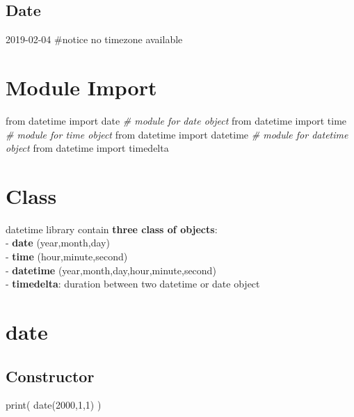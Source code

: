\documentclass[
]{book}
\newenvironment{Shaded}{\begin{snugshade}}{\end{snugshade}}
\newcommand{\BuiltInTok}[1]{#1}
\newcommand{\CommentTok}[1]{\textcolor[rgb]{0.37,0.37,0.37}{\textit{#1}}}
\newcommand{\DecValTok}[1]{\textcolor[rgb]{0.06,0.06,0.06}{#1}}
\newcommand{\ImportTok}[1]{#1}
\newcommand{\NormalTok}[1]{#1}
\begin{document}
\hypertarget{date}{%
\subsection{Date}\label{date}}

2019-02-04 \#notice no timezone available

\hypertarget{module-import}{%
\section{Module Import}\label{module-import}}

\begin{Shaded}
\begin{Highlighting}[]
\ImportTok{from}\NormalTok{ datetime }\ImportTok{import}\NormalTok{ date     }\CommentTok{\# module for date object}
\ImportTok{from}\NormalTok{ datetime }\ImportTok{import}\NormalTok{ time     }\CommentTok{\# module for time object}
\ImportTok{from}\NormalTok{ datetime }\ImportTok{import}\NormalTok{ datetime }\CommentTok{\# module for datetime object}
\ImportTok{from}\NormalTok{ datetime }\ImportTok{import}\NormalTok{ timedelta}
\end{Highlighting}
\end{Shaded}

\hypertarget{class}{%
\section{Class}\label{class}}

datetime library contain \textbf{three class of objects}:\\
- \textbf{date} (year,month,day)\\
- \textbf{time} (hour,minute,second)\\
- \textbf{datetime} (year,month,day,hour,minute,second)\\
- \textbf{timedelta}: duration between two datetime or date object

\hypertarget{date-1}{%
\section{date}\label{date-1}}

\hypertarget{constructor-3}{%
\subsection{Constructor}\label{constructor-3}}

\begin{Shaded}
\begin{Highlighting}[]
\BuiltInTok{print}\NormalTok{( date(}\DecValTok{2000}\NormalTok{,}\DecValTok{1}\NormalTok{,}\DecValTok{1}\NormalTok{) )}
\end{Highlighting}
\end{Shaded}
\end{document}
